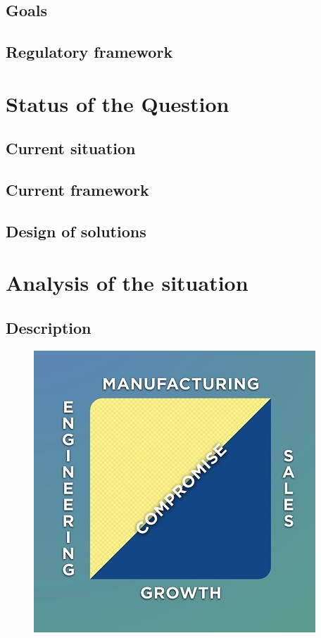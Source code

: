 \documentclass[12pt]{report} %
\begin{document}
\section{Goals}
\lipsum[1-2]

\section{Regulatory framework}
\lipsum[5-6]


\chapter{Status of the Question}

\section{Current situation}
\lipsum[10-13]

\section{Current framework}
\lipsum[8-9]

\section{Design of solutions}
\lipsum[4-5]


\chapter{Analysis of the situation}

\section{Description}
\lipsum[19]
\begin{figure}[H]
	{\includegraphics[scale=0.6]{success.jpg}}
\end{figure}
\end{document}
